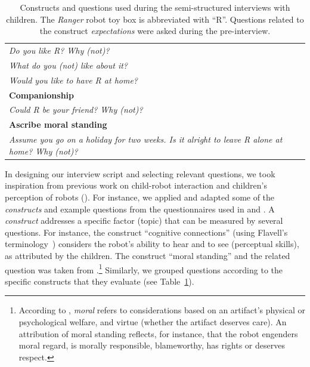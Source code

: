 \documentclass[letterpaper, 10pt, conference]{ieeeconf}
\begin{document}
\begin{table}[h!t]
\begin{tabular}{p{1\linewidth}}
    \emph{Do you like R? Why (not)?} \\
    \emph{What do you (not) like about it?} \\
    \emph{Would you like to have R at home?} \\

    \vspace{0.2em}
    \textbf{Companionship} \\


    \emph{Could R be your friend? Why (not)?}\\

    \vspace{0.2em}
    \textbf{Ascribe moral standing} \\


    \emph{Assume you go on a holiday for two weeks. Is it alright to leave R
    alone at home? Why (not)?} \\

    \bottomrule

\end{tabular}

    \caption{\small Constructs and questions used during the semi-structured interviews
    with children. The \emph{Ranger} robot toy box is abbreviated with ``R''. Questions
    related to the construct \emph{expectations} were asked during the
    pre-interview.}

    \label{tab:domino-questions} 

\end{table}


In designing our interview script and selecting relevant questions, we took
inspiration from previous work on child-robot interaction and children's
perception of robots
(\cite{kahn_jr._robotic_2006,leite_influence_2013,weiss_i_2009}). For instance, we
applied and adapted some of the \emph{constructs} and example questions from the
questionnaires used in \cite{kahn_jr._robotic_2006} and \cite{weiss_i_2009}. A
\emph{construct} addresses a specific factor (topic) that can be measured by
several questions. For instance, the construct ``cognitive connections'' (using
Flavell's terminology~\cite{flavell1988development}) considers the robot's
ability to hear and to see (perceptual skills), as attributed by the children.
The construct ``moral standing'' and the related question was taken from
\cite{kahn_jr._robotic_2006}.\footnote{According to
\cite{kahn_jr._robotic_2006}, \textit{moral} refers to considerations based
on an artifact's physical or psychological welfare, and virtue (whether the
artifact deserves care). An attribution of moral standing reflects, for
instance, that the robot engenders moral regard, is morally responsible,
blameworthy, has rights or deserves respect.} Similarly, we grouped
questions according to the specific constructs that they evaluate (see
Table~\ref{tab:domino-questions}).
\end{document}
